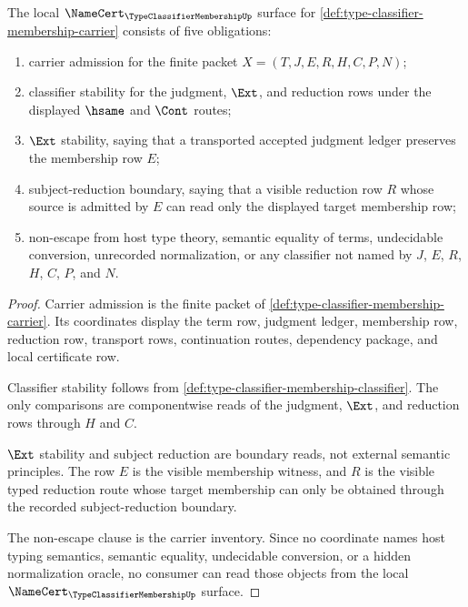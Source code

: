 \begin{theorem}
\label{thm:type-classifier-membership-namecert-obligations}
The local $\NameCert_{\TypeClassifierMembershipUp}$ surface for \autoref{def:type-classifier-membership-carrier} consists of five obligations:
\begin{enumerate}
\item carrier admission for the finite packet $X=(T,J,E,R,H,C,P,N)$;
\item classifier stability for the judgment, $\Ext$, and reduction rows under the displayed $\hsame$ and $\Cont$ routes;
\item $\Ext$ stability, saying that a transported accepted judgment ledger preserves the membership row $E$;
\item subject-reduction boundary, saying that a visible reduction row $R$ whose source is admitted by $E$ can read only the displayed target membership row;
\item non-escape from host type theory, semantic equality of terms, undecidable conversion, unrecorded normalization, or any classifier not named by $J$, $E$, $R$, $H$, $C$, $P$, and $N$.
\end{enumerate}
\end{theorem}
\begin{proof}
Carrier admission is the finite packet of \autoref{def:type-classifier-membership-carrier}. Its coordinates display the term row, judgment ledger, membership row, reduction row, transport rows, continuation routes, dependency package, and local certificate row.

Classifier stability follows from \autoref{def:type-classifier-membership-classifier}. The only comparisons are componentwise reads of the judgment, $\Ext$, and reduction rows through $H$ and $C$.

$\Ext$ stability and subject reduction are boundary reads, not external semantic principles. The row $E$ is the visible membership witness, and $R$ is the visible typed reduction route whose target membership can only be obtained through the recorded subject-reduction boundary.

The non-escape clause is the carrier inventory. Since no coordinate names host typing semantics, semantic equality, undecidable conversion, or a hidden normalization oracle, no consumer can read those objects from the local $\NameCert_{\TypeClassifierMembershipUp}$ surface.
\end{proof}

